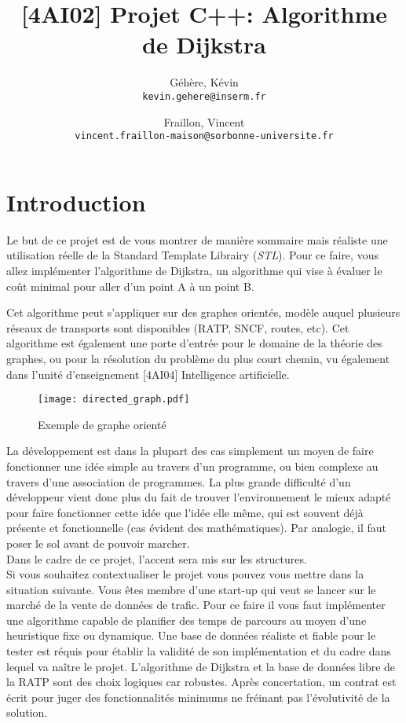 \documentclass[9pts]{article}
\title{[4AI02] Projet C++: Algorithme de Dijkstra}
\author{
  Géhère, Kévin\\
  \texttt{kevin.gehere@inserm.fr}
  \and
  Fraillon, Vincent\\
  \texttt{vincent.fraillon-maison@sorbonne-universite.fr}
}
\begin{document}
\maketitle

\section{Introduction}
Le but de ce projet est de vous montrer de manière sommaire mais réaliste une utilisation réelle de la Standard Template Librairy (\emph{STL}).
Pour ce faire, vous allez implémenter l'algorithme de Dijkstra,
un algorithme qui vise à évaluer le coût minimal pour aller d'un point A à un point B.

Cet algorithme peut s'appliquer sur des graphes orientés, modèle auquel plusieurs réseaux de transports sont disponibles (RATP, SNCF, routes, etc). Cet algorithme est également une porte d'entrée pour le domaine de la théorie des graphes, ou pour la résolution du problème du plus court chemin, vu également dans l'unité d'enseignement [4AI04] Intelligence artificielle.

\begin{figure}[h]
   \centering
   \texttt{[image: directed\_graph.pdf]}
   \caption{\label{directed_graph} Exemple de graphe orienté}
\end{figure}

La développement est dans la plupart des cas simplement un moyen de faire fonctionner une idée simple au travers d'un programme, ou bien complexe au travers d'une association de programmes.
La plus grande difficulté d'un développeur vient donc plus du fait de trouver l'environnement le mieux adapté pour faire fonctionner cette idée que l'idée elle même,
qui est souvent déjà présente et fonctionnelle (cas évident des mathématiques).
Par analogie, il faut poser le sol avant de pouvoir marcher. \\

Dans le cadre de ce projet, l'accent sera mis sur les structures.\\

Si vous souhaitez contextualiser le projet vous pouvez vous mettre dans la situation suivante.
Vous êtes membre d'une start-up qui veut se lancer sur le marché de la vente de données de trafic.
Pour ce faire il vous faut implémenter une algorithme capable de planifier des temps de parcours au moyen d'une heuristique fixe ou dynamique.
Une base de données réaliste et fiable pour le tester est réquis pour établir la validité de son implémentation et du cadre dans lequel va naître le projet.
L'algorithme de Dijkstra et la base de données libre de la RATP sont des choix logiques car robustes.
Après concertation, un contrat est écrit pour juger des fonctionnalités minimums ne fréinant pas l'évolutivité de la solution.
\end{document}
